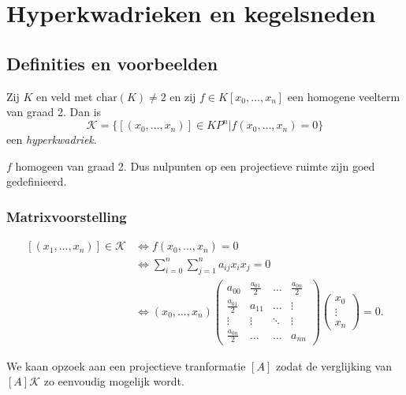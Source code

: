 \chapter{Hyperkwadrieken en kegelsneden} \label{chap:hyperkwadrieken_en_kegelsneden}
\section{Definities en voorbeelden} \label{sec:definities_en_voorbeelden}
\begin{definitie}
	Zij $K $ en veld met $\text{char}\left( K \right) \ne 2$ en zij $f \in K[x_0, \ldots, x_n]$ een homogene veelterm van graad 2.  
	Dan is \[ \mathcal{K}   =  \{[(x_0, \ldots, x_n)] \in KP^{n} | f(x_0, \ldots, x_n) = 0\} \]
	een \emph{hyperkwadriek}.
\end{definitie}

\begin{opmerking}
	$f$ homogeen van graad 2. Dus nulpunten op een projectieve ruimte zijn goed gedefinieerd.
\end{opmerking}

\subsection{Matrixvoorstelling} \label{sec:matrixvoorstelling}
\begin{align*}
	\left[ (x_1, \ldots, x_n) \right] \in \mathcal{K} &\iff f(x_0, \ldots, x_n) = 0 \\
							  &\iff \sum_{i = 0}^{n} \sum_{j = 1}^{n} a_{ij}x_i x_j = 0\\
							  &\iff (x_0, \ldots, x_n)
	\begin{pmatrix} a_{00} & \frac{a_{01}}{2} & \ldots & \frac{a_{0n}}{2} \\
		\frac{a_{01}}{2}& a_{11} & \ldots & \vdots \\
		\vdots & \vdots & \ddots & \vdots\\
		\frac{a_{0n}}{2} & \ldots & \ldots& a_{nn}
	\end{pmatrix}
	\begin{pmatrix} x_0 \\ \vdots \\ x_n \end{pmatrix} = 0 
.\end{align*}

We kaan opzoek aan een projectieve tranformatie $[A]$ zodat de verglijking van  $[A] \mathcal{K} $ zo eenvoudig mogelijk wordt.


